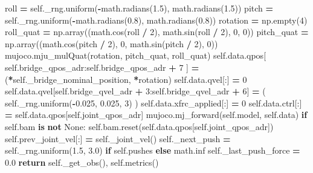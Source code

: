 \documentclass[
  chinese,
  11pt,
  letterpaper,
]{article}
\newenvironment{Shaded}{\begin{snugshade}}{\end{snugshade}}
\newcommand{\ControlFlowTok}[1]{\textcolor[rgb]{0.13,0.29,0.53}{\textbf{#1}}}
\newcommand{\DecValTok}[1]{\textcolor[rgb]{0.00,0.00,0.81}{#1}}
\newcommand{\FloatTok}[1]{\textcolor[rgb]{0.00,0.00,0.81}{#1}}
\newcommand{\KeywordTok}[1]{\textcolor[rgb]{0.13,0.29,0.53}{\textbf{#1}}}
\newcommand{\NormalTok}[1]{#1}
\newcommand{\OperatorTok}[1]{\textcolor[rgb]{0.81,0.36,0.00}{\textbf{#1}}}
\newcommand{\VariableTok}[1]{\textcolor[rgb]{0.00,0.00,0.00}{#1}}
\renewenvironment{Shaded}{\par\smallskip}{\par\smallskip}
\begin{document}
\begin{Shaded}
\begin{Highlighting}[]
\NormalTok{        roll }\OperatorTok{=} \VariableTok{self}\NormalTok{.\_rng.uniform(}\OperatorTok{{-}}\NormalTok{math.radians(}\FloatTok{1.5}\NormalTok{), math.radians(}\FloatTok{1.5}\NormalTok{))}
\NormalTok{        pitch }\OperatorTok{=} \VariableTok{self}\NormalTok{.\_rng.uniform(}\OperatorTok{{-}}\NormalTok{math.radians(}\FloatTok{0.8}\NormalTok{), math.radians(}\FloatTok{0.8}\NormalTok{))}
\NormalTok{        rotation }\OperatorTok{=}\NormalTok{ np.empty(}\DecValTok{4}\NormalTok{)}
\NormalTok{        roll\_quat }\OperatorTok{=}\NormalTok{ np.array((math.cos(roll }\OperatorTok{/} \DecValTok{2}\NormalTok{), math.sin(roll }\OperatorTok{/} \DecValTok{2}\NormalTok{), }\DecValTok{0}\NormalTok{, }\DecValTok{0}\NormalTok{))}
\NormalTok{        pitch\_quat }\OperatorTok{=}\NormalTok{ np.array((math.cos(pitch }\OperatorTok{/} \DecValTok{2}\NormalTok{), }\DecValTok{0}\NormalTok{, math.sin(pitch }\OperatorTok{/} \DecValTok{2}\NormalTok{), }\DecValTok{0}\NormalTok{))}
\NormalTok{        mujoco.mju\_mulQuat(rotation, pitch\_quat, roll\_quat)}
        \VariableTok{self}\NormalTok{.data.qpos[}
            \VariableTok{self}\NormalTok{.bridge\_qpos\_adr:}\VariableTok{self}\NormalTok{.bridge\_qpos\_adr }\OperatorTok{+} \DecValTok{7}
\NormalTok{        ] }\OperatorTok{=}\NormalTok{ (}\OperatorTok{*}\VariableTok{self}\NormalTok{.\_bridge\_nominal\_position, }\OperatorTok{*}\NormalTok{rotation)}
        \VariableTok{self}\NormalTok{.data.qvel[:] }\OperatorTok{=} \DecValTok{0}
        \VariableTok{self}\NormalTok{.data.qvel[}\VariableTok{self}\NormalTok{.bridge\_qvel\_adr }\OperatorTok{+} \DecValTok{3}\NormalTok{:}\VariableTok{self}\NormalTok{.bridge\_qvel\_adr }\OperatorTok{+} \DecValTok{6}\NormalTok{] }\OperatorTok{=}\NormalTok{ (}
            \VariableTok{self}\NormalTok{.\_rng.uniform(}\OperatorTok{{-}}\FloatTok{0.025}\NormalTok{, }\FloatTok{0.025}\NormalTok{, }\DecValTok{3}\NormalTok{)}
\NormalTok{        )}
        \VariableTok{self}\NormalTok{.data.xfrc\_applied[:] }\OperatorTok{=} \DecValTok{0}
        \VariableTok{self}\NormalTok{.data.ctrl[:] }\OperatorTok{=} \VariableTok{self}\NormalTok{.data.qpos[}\VariableTok{self}\NormalTok{.joint\_qpos\_adr]}
\NormalTok{        mujoco.mj\_forward(}\VariableTok{self}\NormalTok{.model, }\VariableTok{self}\NormalTok{.data)}
        \ControlFlowTok{if} \VariableTok{self}\NormalTok{.bam }\KeywordTok{is} \KeywordTok{not} \VariableTok{None}\NormalTok{:}
            \VariableTok{self}\NormalTok{.bam.reset(}\VariableTok{self}\NormalTok{.data.qpos[}\VariableTok{self}\NormalTok{.joint\_qpos\_adr])}
        \VariableTok{self}\NormalTok{.prev\_joint\_vel[:] }\OperatorTok{=} \VariableTok{self}\NormalTok{.\_joint\_vel()}
        \VariableTok{self}\NormalTok{.\_next\_push }\OperatorTok{=} \VariableTok{self}\NormalTok{.\_rng.uniform(}\FloatTok{1.5}\NormalTok{, }\FloatTok{3.0}\NormalTok{) }\ControlFlowTok{if} \VariableTok{self}\NormalTok{.pushes }\ControlFlowTok{else}\NormalTok{ math.inf}
        \VariableTok{self}\NormalTok{.\_last\_push\_force }\OperatorTok{=} \FloatTok{0.0}
        \ControlFlowTok{return} \VariableTok{self}\NormalTok{.\_get\_obs(), }\VariableTok{self}\NormalTok{.metrics()}


\end{Highlighting}
\end{Shaded}
\end{document}
